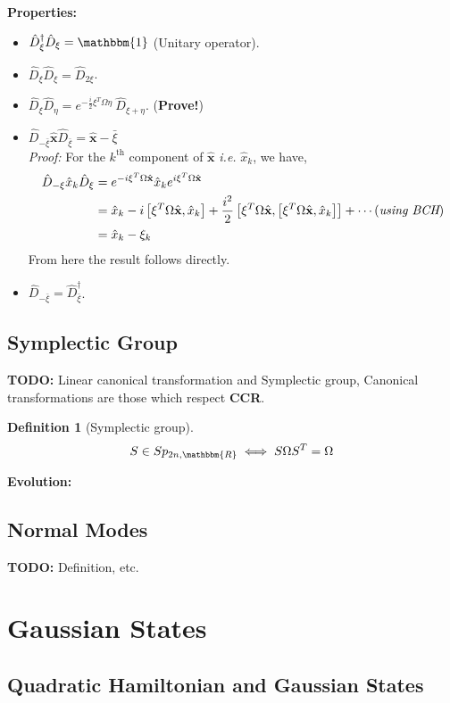 \documentclass[english,10pt,a4paper]{article}
\newtheorem{definition}{Definition}
\newcommand{\xx}{\hat{\textbf{x}}}
\newcommand{\dd}[1]{\hat{D}_{#1}}
\begin{document}
	\textbf{Properties:}	\begin{itemize}
		\item $\dd{\xi}^\dagger \dd{\xi} = \mathbbm{1}$ (Unitary operator).
		\item $\dd{\xi}\dd{\xi}=\dd{2\xi}$.
		\item $\dd{\xi}\dd{\eta} = e^{-\frac{i}{2}\xi^T\Omega \eta}\ \dd{\xi+\eta}$. (\textbf{Prove!})
		\item$\dd{-\bar{\xi}} \xx \dd{\bar{\xi}} = \xx - \bar{\xi}$\\
		\textit{Proof:} For the $k^\text{th}$ component of $\xx$ \textit{i.e.} $\hat x_k$, we have, \begin{align*}
			\dd{-\xi} \hat x_k \dd{\xi} &= e^{-i\xi^T \Omega\xx}\hat x_k e^{i\xi^T \Omega\xx} \\
			&= \hat x_k -i\left[\xi^T\Omega\xx, \hat x_k \right] + \frac{i^2}{2}\left[ \xi^T\Omega\xx, \left[\xi^T\Omega\xx, \hat x_k \right]   \right] + \cdots \hfil (\textit{using BCH})\\
			&=\hat x_k -\xi_k
		\end{align*}
		From here the result follows directly.
		\item $\dd{-\bar{\xi}} = \dd{\bar{\xi}}^\dagger$.
	\end{itemize}
	
	
	
	\subsection{Symplectic Group}
	\textbf{TODO:} Linear canonical transformation and Symplectic group, Canonical transformations are those which respect  \textbf{CCR}.
	\begin{definition}
		[Symplectic group]
		\begin{equation}
			S\in Sp_{2n,\mathbbm{R}} \iff S\Omega S^T=\Omega
		\end{equation}
	\end{definition}
	\textbf{Evolution:}
	
	
	\subsection{Normal Modes}
	\textbf{TODO: }Definition, etc.
	
	\section{Gaussian States}
	
	\subsection{Quadratic Hamiltonian and Gaussian States}
	
\end{document}

